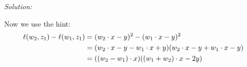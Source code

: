\documentclass[
10pt, %
a4paper, %
oneside, %
headinclude,footinclude, %
BCOR5mm, %
]{scrartcl}
\newenvironment{solution}
               {\textit{Solution:}}
               {}
\begin{document}
\begin{solution}
\begin{enumerate}
        Now we use the hint:
        \begin{align*}
          \ell(w_2,z_1) - \ell(w_1,z_1) &= (w_2\cdot x - y)^2 - (w_1\cdot x - y)^2 \\
          \hphantom{\ell(w_2,z_1) - \ell(w_1,z_1)} &= (w_2\cdot x - y - w_1\cdot x + y)(w_2\cdot x - y + w_1\cdot x - y) \\
          \hphantom{\ell(w_2,z_1) - \ell(w_1,z_1)} &= ((w_2 - w_1)\cdot x)((w_1 + w_2)\cdot x - 2y)
        \end{align*}
  \end{enumerate}
\end{solution}


\end{document}
